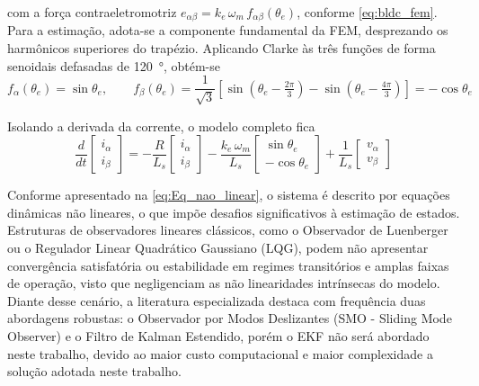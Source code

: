 \noindent com a força contraeletromotriz $e_{\alpha\beta} = k_e\,\omega_m\,
f_{\alpha\beta}(\theta_e)$, conforme \eqref{eq:bldc_fem}. Para a estimação,
adota-se a componente fundamental da FEM, desprezando os harmônicos
superiores do trapézio. Aplicando Clarke às três funções de forma senoidais
defasadas de \SI{120}{\degree}, obtém-se
\begin{equation}
    f_\alpha(\theta_e) = \sin\theta_e, \qquad
    f_\beta(\theta_e) = \frac{1}{\sqrt{3}}\left[\sin\!\left(\theta_e - \tfrac{2\pi}{3}\right)
    - \sin\!\left(\theta_e - \tfrac{4\pi}{3}\right)\right] = -\cos\theta_e
    \label{eq:f_alphabeta}
\end{equation}

\noindent Isolando a derivada da corrente, o modelo completo fica
\begin{equation}
    \frac{d}{dt}\begin{bmatrix} i_\alpha \\ i_\beta \end{bmatrix}
    = -\frac{R}{L_s} \begin{bmatrix} i_\alpha \\ i_\beta \end{bmatrix}
    - \frac{k_e\,\omega_m}{L_s} \begin{bmatrix} \sin\theta_e \\ -\cos\theta_e \end{bmatrix}
    + \frac{1}{L_s} \begin{bmatrix} v_\alpha \\ v_\beta \end{bmatrix}
    \label{eq:Eq_nao_linear}
\end{equation}

Conforme apresentado na \autoref{eq:Eq_nao_linear}, o sistema é descrito por equações dinâmicas não lineares, o que impõe desafios significativos à estimação de estados. Estruturas de observadores lineares clássicos, como o Observador de Luenberger ou o Regulador Linear Quadrático Gaussiano (LQG), podem não apresentar convergência satisfatória ou estabilidade em regimes transitórios e amplas faixas de operação, visto que negligenciam as não linearidades intrínsecas do modelo. Diante desse cenário, a literatura especializada destaca com frequência duas abordagens robustas: o Observador por Modos Deslizantes (SMO - Sliding Mode Observer) e o Filtro de Kalman Estendido, porém o EKF não será abordado neste trabalho, devido ao maior custo computacional e maior complexidade a solução adotada neste trabalho.

